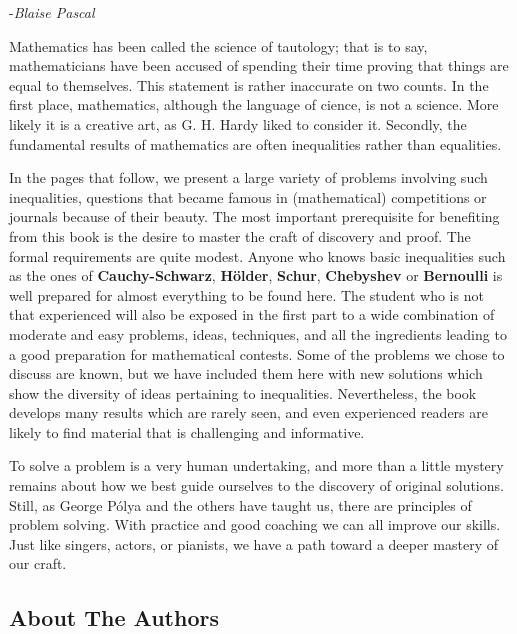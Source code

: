 \documentclass{article}
\begin{document}
\begin{flushright}
-{\itshape Blaise Pascal}
\end{flushright}
Mathematics has been called the science of tautology; that is to say, mathematicians have been accused of spending their time proving that things are equal to themselves. This statement is rather inaccurate on two counts. In the first place, mathematics, although the language of cience, is not a science. More likely it is a creative art, as G. H. Hardy liked to consider it. Secondly, the fundamental results of mathematics are often inequalities rather than equalities.\par
In the pages that follow, we present a large variety of problems involving such inequalities, questions that became famous in (mathematical) competitions or journals because of their beauty. The most important prerequisite for benefiting from this book is the desire to master the craft of discovery and proof. The formal requirements are quite modest. Anyone who knows basic inequalities such as the ones of \textbf {Cauchy-Schwarz}, \textbf{H\"{o}lder}, \textbf{Schur}, \textbf{Chebyshev} or \textbf{Bernoulli} is well prepared for almost everything to be found here. The student who is not that experienced will also be exposed in the first part to a wide combination of moderate and easy problems, ideas, techniques, and all the ingredients leading to a good preparation for mathematical contests. Some of the problems we chose to discuss are known, but we have included them here with new solutions which show the diversity of ideas pertaining to inequalities. Nevertheless, the book develops many results which are rarely seen, and even experienced readers are likely to find material that is challenging and informative.\par
To solve a problem is a very human undertaking, and more than a little mystery remains about how we best guide ourselves to the discovery of original solutions. Still, as George Pólya and the others have taught us, there are principles of problem solving. With practice and good coaching we can all improve our skills. Just like singers, actors, or pianists, we have a path toward a deeper mastery of our craft. 

	
\pagebreak
	
\thispagestyle{empty} 
	
\vspace*{5cm}
	
\begin{center}
\section*{About The Authors}
\end{center}
\end{document}
